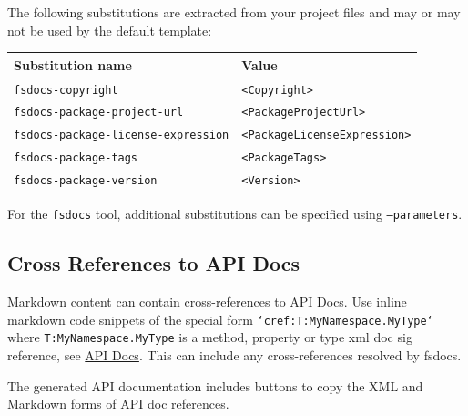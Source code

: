 \documentclass{article}
\begin{document}
The following substitutions are extracted from your project files and may or may not be used by the default
template:
\begin{tabular}{|l|l|}\hline
\textbf{Substitution name} & \textbf{Value}\\ \hline\hline
\texttt{fsdocs-copyright} & \texttt{<Copyright>}\\ \hline
\texttt{fsdocs-package-project-url} & \texttt{<PackageProjectUrl>}\\ \hline
\texttt{fsdocs-package-license-expression} & \texttt{<PackageLicenseExpression>}\\ \hline
\texttt{fsdocs-package-tags} & \texttt{<PackageTags>}\\ \hline
\texttt{fsdocs-package-version} & \texttt{<Version>}\\ \hline
\end{tabular}



For the \texttt{fsdocs} tool, additional substitutions can be specified using \texttt{--parameters}.
\subsection*{Cross References to API Docs}



Markdown content can contain cross-references to API Docs.  Use inline
markdown code snippets of the special form \texttt{`cref:T:MyNamespace.MyType`} where \texttt{T:MyNamespace.MyType}
is a method, property or type xml doc sig reference, see \href{apidocs.html}{API Docs}.
This can include any cross-references resolved by fsdocs.


The generated API documentation includes buttons to copy the XML and Markdown forms of API doc references.
\end{document}
